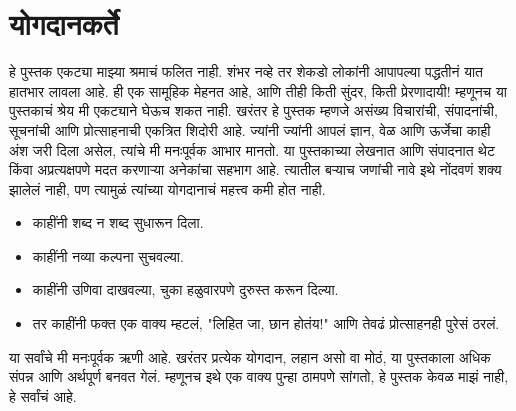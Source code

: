  \chapter{योगदानकर्ते}
हे पुस्तक एकट्या माझ्या श्रमाचं फलित नाही. शंभर नव्हे तर शेकडो लोकांनी आपापल्या पद्धतीनं यात हातभार लावला आहे. ही एक सामूहिक मेहनत आहे,  आणि तीही किती सुंदर, किती प्रेरणादायी!
म्हणूनच या पुस्तकाचं श्रेय मी एकट्याने घेऊच शकत नाही. खरंतर हे पुस्तक म्हणजे असंख्य विचारांची, संपादनांची, सूचनांची आणि प्रोत्साहनाची एकत्रित शिदोरी आहे. ज्यांनी ज्यांनी आपलं ज्ञान, वेळ आणि ऊर्जेचा काही अंश जरी दिला असेल, त्यांचे मी मनःपूर्वक आभार मानतो.
या पुस्तकाच्या लेखनात आणि संपादनात थेट किंवा अप्रत्यक्षपणे मदत करणाऱ्या अनेकांचा सहभाग आहे. त्यातील बऱ्याच जणांची नावे इथे नोंदवणं शक्य झालेलं नाही, पण त्यामुळं त्यांच्या योगदानाचं महत्त्व कमी होत नाही.
\begin{itemize}
 \item काहींनी शब्द न शब्द सुधारून दिला.
 \item काहींनी नव्या कल्पना सुचवल्या.
 \item काहींनी उणिवा दाखवल्या, चुका हळुवारपणे दुरुस्त करून दिल्या.
 \item तर काहींनी फक्त एक वाक्य म्हटलं,  "लिहित जा, छान होतंय!" आणि तेवढं प्रोत्साहनही पुरेसं ठरलं.
 \end{itemize}
या सर्वांचे मी मनःपूर्वक ऋणी आहे. खरंतर प्रत्येक योगदान, लहान असो वा मोठं, या पुस्तकाला अधिक संपन्न आणि अर्थपूर्ण बनवत गेलं.
म्हणूनच इथे एक वाक्य पुन्हा ठामपणे सांगतो,  हे पुस्तक केवळ माझं नाही, हे सर्वांचं आहे.

